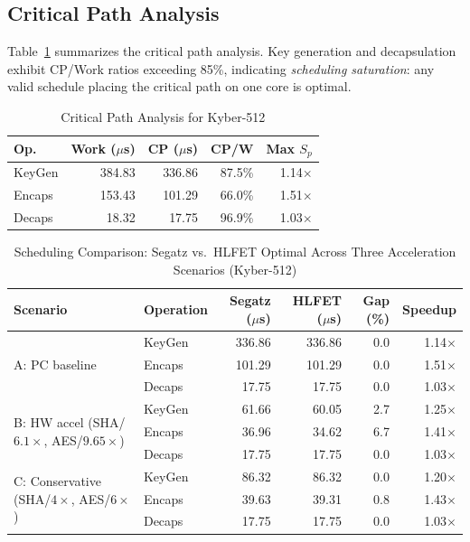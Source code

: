 \documentclass[conference]{IEEEtran}
\begin{document}
\subsection{Critical Path Analysis}

Table~\ref{tab:critical_path} summarizes the critical path analysis. Key generation and decapsulation exhibit CP/Work ratios exceeding 85\%, indicating \emph{scheduling saturation}: any valid schedule placing the critical path on one core is optimal.

\begin{table}[!t]
\renewcommand{\arraystretch}{1.1}
\caption{Critical Path Analysis for Kyber-512}
\label{tab:critical_path}
\centering
\begin{tabular}{l r r r r}
\toprule
\textbf{Op.} & \textbf{Work ($\mu$s)} & \textbf{CP ($\mu$s)} & \textbf{CP/W} & \textbf{Max $S_p$} \\
\midrule
KeyGen & 384.83 & 336.86 & 87.5\% & 1.14$\times$ \\
Encaps & 153.43 & 101.29 & 66.0\% & 1.51$\times$ \\
Decaps &  18.32 &  17.75 & 96.9\% & 1.03$\times$ \\
\bottomrule
\end{tabular}
\end{table}

\begin{table}[!t]
\renewcommand{\arraystretch}{1.1}
\caption{Scheduling Comparison: Segatz vs.\ HLFET Optimal Across Three Acceleration Scenarios (Kyber-512)}
\label{tab:scheduling}
\centering
\begin{tabular}{l l r r r r}
\toprule
\textbf{Scenario} & \textbf{Operation} & \textbf{Segatz ($\mu$s)} & \textbf{HLFET ($\mu$s)} & \textbf{Gap (\%)} & \textbf{Speedup} \\
\midrule
\multirow{3}{*}{A: PC baseline} & KeyGen & 336.86 & 336.86 & 0.0 & 1.14$\times$ \\
 & Encaps & 101.29 & 101.29 & 0.0 & 1.51$\times$ \\
 & Decaps &  17.75 &  17.75 & 0.0 & 1.03$\times$ \\
\midrule
\multirow{3}{*}{B: HW accel (SHA/$6.1\times$, AES/$9.65\times$)} & KeyGen &  61.66 &  60.05 & 2.7 & 1.25$\times$ \\
 & Encaps &  36.96 &  34.62 & 6.7 & 1.41$\times$ \\
 & Decaps &  17.75 &  17.75 & 0.0 & 1.03$\times$ \\
\midrule
\multirow{3}{*}{C: Conservative (SHA/$4\times$, AES/$6\times$)} & KeyGen &  86.32 &  86.32 & 0.0 & 1.20$\times$ \\
 & Encaps &  39.63 &  39.31 & 0.8 & 1.43$\times$ \\
 & Decaps &  17.75 &  17.75 & 0.0 & 1.03$\times$ \\
\bottomrule
\end{tabular}
\end{table}
\end{document}
